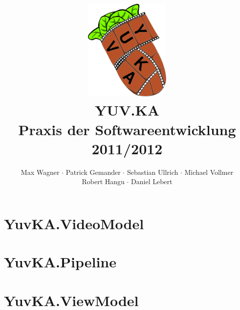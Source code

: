 \documentclass{scrartcl}
\begin{document}
\title{
    \hspace{-0.5cm} \includegraphics[height=5cm]{logo.png} \\[1cm]
    \Huge{YUV.KA} \\ \large{Praxis der Softwareentwicklung 2011/2012}
}
\author{Max Wagner $\cdot$ Patrick Gemander $\cdot$ Sebastian Ullrich $\cdot$ Michael Vollmer \\ Robert Hangu $\cdot$ Daniel Lebert}
\maketitle

\newpage
\mbox{}
\newpage
\mbox{}

\tableofcontents
\newpage
\mbox{}
\newpage
\section{YuvKA.VideoModel}


\section{YuvKA.Pipeline}







\section{YuvKA.ViewModel}


\end{document}
